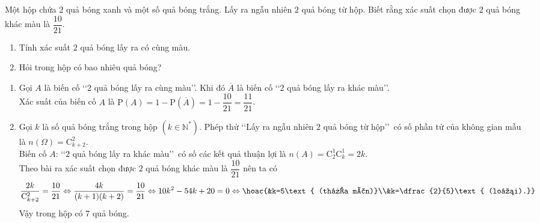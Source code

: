 \begin{bt}%
	Một hộp chứa $2$ quả bóng xanh và một số quả bóng trắng. Lấy ra ngẫu nhiên $2$ quả bóng từ hộp. Biết rằng xác suất chọn được $2$ quả bóng khác màu là $\dfrac{10}{21}$.
	\begin{enumerate}
		\item Tính xác suất $2$ quả bóng lấy ra có cùng màu.
		\item Hỏi trong hộp có bao nhiêu quả bóng?
	\end{enumerate}
	\loigiai
	{\begin{enumerate}
			\item Gọi $A$ là biến cố \lq\lq $2$ quả bóng lấy ra cùng màu\rq\rq. Khi đó $\overline{A}$ là biến cố \lq\lq $2$ quả bóng lấy ra khác màu\rq\rq.\\
			Xác suất của biến cố $A$ là $\mathrm{P}(A)=1-\mathrm{P}\left(\overline{A}\right)=1-\dfrac{10}{21}=\dfrac{11}{21}$.
			\item Gọi $k$ là số quả bóng trắng trong hộp $\left(k \in\mathbb{N}^*\right)$. Phép thử \lq\lq Lấy ra ngẫu nhiên $2$ quả bóng từ hộp\rq\rq\, có số phần tử của không gian mẫu là $n(\Omega)=\mathrm{C}_{k+2}^2$.\\
			Biến cố $A$: \lq\lq $2$ quả bóng lấy ra khác màu\rq\rq\, có số các kết quả thuận lợi là $n(A)=\mathrm{C}_2^1\mathrm{C}_k^1=2k$.\\
			Theo bài ra xác suất chọn được $2$ quả bóng khác màu là $\dfrac{10}{21}$ nên ta có
			$$\dfrac{2k}{\mathrm{C}_{k+2}^2}=\dfrac{10}{21} \Leftrightarrow \dfrac{4k}{(k+1)(k+2)}=\dfrac{10}{21} \Leftrightarrow 10k^2-54k+20=0 \Leftrightarrow \hoac{&k=5\text{ (thỏa mãn)}\\&k=\dfrac{2}{5}\text{ (loại).}}$$
			Vậy trong hộp có $7$ quả bóng.
	\end{enumerate}}
\end{bt}

